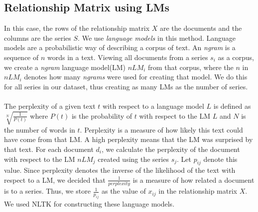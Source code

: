 \documentclass[11pt]{article}
\begin{document}
\subsection{Relationship Matrix using LMs}
In this case, the rows of the relationship matrix $X$ are the documents and the columns are the series $S$. We use \emph{language models} in this method. Language models are a probabilistic way of describing a corpus of text. An \emph{ngram} is a sequence of $n$ words in a text. Viewing all documents from a series $s_i$ as a corpus, we create a \emph{ngram} language model(LM) $nLM_i$ from that corpus, where the $n$ in $nLM_i$ denotes how many \emph{ngrams} were used for creating that model. We do this for all series in our dataset, thus creating as many LMs as the number of series.\\\\
The perplexity of a given text $t$ with respect to a language model $L$ is defined as $\sqrt[N]{\frac{1}{P(t)}}$ where $P(t)$ is the probability of $t$ with respect to the LM $L$ and $N$ is the number of words in $t$. Perplexity is a measure of how likely this text could have come from that LM. A high perplexity means that the LM was surprised by that text.
For each document $d_i$, we calculate the perplexity of the document with respect to the LM $nLM_j$ created using the series $s_j$. Let $p_{ij}$ denote this value.
Since perplexity denotes the inverse of the likelihood of the text with respect to a LM, we decided that $\frac{1}{perplexity}$ is a measure of how related a document is to a series. Thus, we store $\frac{1}{p_{ij}}$ as the value of $x_{ij}$ in the relationship matrix $X$. \\
We used NLTK \cite{nltk} for constructing these language models.
\end{document}
